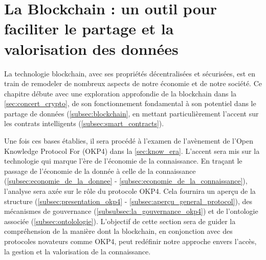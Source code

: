 \chapter{La Blockchain : un outil pour faciliter le partage et la valorisation des données}\label{chap:chapiter2}

La technologie blockchain, avec ses propriétés décentralisées et sécurisées, est en train de remodeler de nombreux aspects de notre économie et de notre société. Ce chapitre débute avec une exploration approfondie de la blockchain dans la \autoref{sec:concert_crypto}, de son fonctionnement fondamental à son potentiel dans le partage de données (\ref{subsec:blockchain}, en mettant particulièrement l'accent sur les contrats intelligents (\ref{subsec:smart_contracts}).

Une fois ces bases établies, il sera procédé à l'examen de l'avènement de l'Open Knowledge Protocol For (OKP4) dans la \autoref{sec:know_era}. L'accent sera mis sur la technologie qui marque l'ère de l'économie de la connaissance. En traçant le passage de l'économie de la donnée à celle de la connaissance (\ref{subsec:economie_de_la_donnee} - \ref{subsec:economie_de_la_connaissance}), l'analyse sera axée sur le rôle du protocole OKP4. Cela fournira un aperçu de la structure (\ref{subsec:presentation_okp4} - \ref{subsec:aperçu_general_protocol}), des mécanismes de gouvernance (\ref{subsubsec:la_gouvernance_okp4}) et de l'ontologie associée (\ref{subsec:ontolologie}). L'objectif de cette section sera de guider la compréhension de la manière dont la blockchain, en conjonction avec des protocoles novateurs comme OKP4, peut redéfinir notre approche envers l'accès, la gestion et la valorisation de la connaissance.

